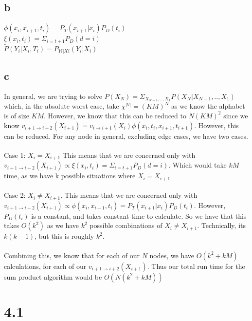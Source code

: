 \documentclass[12pt]{article}
\begin{document}
\subsection{b}
$\phi(x_i,x_{i+1},t_i) = P_T(x_{i+1}|x_{i})P_D(t_i)$
\\
$\xi(x_i,t_i)= \Sigma_{i=t+1}P_D(d= i)$
\\
$\tilde{P}(Y_i|X_i,T_i) = P_{Yi|Xi}(Y_i|X_i)$
\subsection{c}
In general, we are trying to solve $P(X_N) = \Sigma_{X_{N-1},..,X_1}P(X_N|X_{N-1},..,X_1)$ which, in the absolute worst case, take $ \chi^{|V|} = (KM)^N$ as we know the alphabet is of size $KM$. However, we know that this can be reduced to $N(KM)^2$ since we know $v_{i+1 \rightarrow i+2} (X_{i+1}) = v_{i \rightarrow i+1} (X_{i}) \phi(x_i,t_i,x_{i+1},t_{i+1})$. However, this can be reduced. For any node in general, excluding edge cases, we have two cases.\\
\\
Case 1: $X_i = X_{i+1} $ This means that we are concerned only with $v_{i+1 \rightarrow i+2} (X_{i+1}) \propto \xi(x_i,t_i)= \Sigma_{i=t+1}P_D(d= i)$. Which would take $kM$ time, as we have k possible situations where $X_i = X_{i+1} $
\\
\\
Case 2: $X_i \ne X_{i+1} $. This means that we are concerned only with $v_{i+1 \rightarrow i+2} (X_{i+1}) \propto \phi(x_i,x_{i+1},t_i) = P_T(x_{i+1}|x_{i})P_D(t_i)$. However, $P_D(t_i)$ is a constant, and takes constant time to calculate. So we have that this takes $O(k^2)$ as we have $k^2$ possible combinations of $X_i \ne X_{i+1}$. Technically, its $k(k-1)$, but this is roughly $k^2$.
\\
\\
Combining this, we know that for each of our $N$ nodes, we have $O(k^2 +kM)$ calculations, for each of our $v_{i+1 \rightarrow i+2} (X_{i+1})$. Thus our total run time for the sum product algorithm would be $O(N(k^2+kM))$
\section{4.1}
\end{document}
